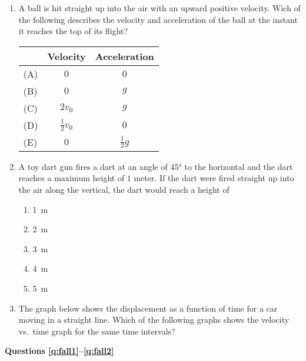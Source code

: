 \documentclass{../../../oss-classkick}
\begin{document}
\begin{multicols*}{2}
\begin{enumerate}[resume,leftmargin=18pt]
  \item A ball is hit straight up into the air with an upward positive
    velocity. Wich of the following describes the velocity and acceleration
    of the ball at the instant it reaches the top of its flight?
    \begin{tabular}{lcc}
      & Velocity & Acceleration\\ \hline
      (A) & $0$ & $0$\\
      (B) & $0$ & $g$\\
      (C) & $2v_0$ & $g$\\
      (D) & $\frac{1}{2}v_0$ & $0$\\
      (E) & $0$ & $\frac{1}{2}g$
    \end{tabular}
    \vspace{.7in}
    
  \item A toy dart gun fires a dart at an angle of \ang{45} to the horizontal
    and the dart reaches a maximum height of $1$ meter. If the dart were fired
    straight up into the air along the vertical, the dart would reach a height
    of
    \begin{enumerate}[nosep,leftmargin=18pt,label=(\Alph*)]
    \item\SI{1}{\metre}
    \item\SI{2}{\metre}
    \item\SI{3}{\metre}
    \item\SI{4}{\metre}
    \item\SI{5}{\metre}
    \end{enumerate}
    
  \item The graph below shows the displacement as a function of time for a
    car moving in a straight line. Which of the following graphs shows the
    velocity vs.\ time graph for the same time intervals?
    \begin{center}
    \end{center}
  \end{enumerate}
  \columnbreak
  
  \textbf{Questions \ref{q:fall1}--\ref{q:fall2}}
  

\end{multicols*}
\end{document}
